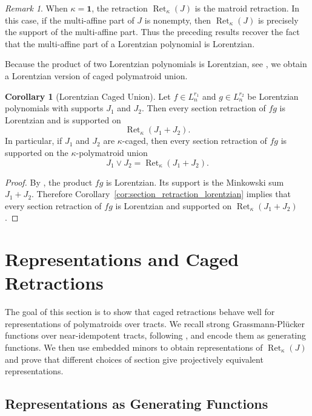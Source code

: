\documentclass[11pt]{article}
\theoremstyle{definition}
\newtheorem{corollary}[theorem]{Corollary}
\theoremstyle{remark}
\newtheorem{remark}[theorem]{Remark}
\newcommand{\ones}{\textbf{1}}
\DeclareMathOperator{\Ret}{Ret}                %
\newcommand{\RetK}{\Ret_{\kappa}}              %
\begin{document}
\begin{remark}
    When $\kappa=\ones$, the retraction $\RetK(J)$ is the matroid retraction. In this case, if the multi-affine part of $J$ is nonempty, then $\RetK(J)$ is precisely the support of the multi-affine part. Thus the preceding results recover the fact that the multi-affine part of a Lorentzian polynomial is Lorentzian.
\end{remark}

Because the product of two Lorentzian polynomials is Lorentzian, see \cite[Corollary~2.32]{branden2024lorentzianpolynomials}, we obtain a Lorentzian version of caged polymatroid union.

\begin{corollary}[Lorentzian Caged Union]\label{cor:lorentzian_caged_union}
    Let $f\in L_n^{r_1}$ and $g\in L_n^{r_2}$ be Lorentzian polynomials with supports $J_1$ and $J_2$. Then every section retraction of $fg$ is Lorentzian and is supported on
    \[
        \RetK(J_1+J_2).
    \]
    In particular, if $J_1$ and $J_2$ are $\kappa$-caged, then every section retraction of $fg$ is supported on the $\kappa$-polymatroid union
    \[
        J_1\vee J_2=\RetK(J_1+J_2).
    \]
\end{corollary}

\begin{proof}
    By \cite[Corollary~2.32]{branden2024lorentzianpolynomials}, the product $fg$ is Lorentzian. Its support is the Minkowski sum $J_1+J_2$. Therefore Corollary~\ref{cor:section_retraction_lorentzian} implies that every section retraction of $fg$ is Lorentzian and supported on $\RetK(J_1+J_2)$.
\end{proof}


\section{Representations and Caged Retractions}
\label{section:representations}

The goal of this section is to show that caged retractions behave well for representations of polymatroids over tracts. We recall strong Grassmann-Plücker functions over near-idempotent tracts, following \cite{baker2025representationtheorypolymatroids}, and encode them as generating functions. We then use embedded minors to obtain representations of $\RetK(J)$ and prove that different choices of section give projectively equivalent representations.

\subsection{Representations as Generating Functions}
\end{document}
